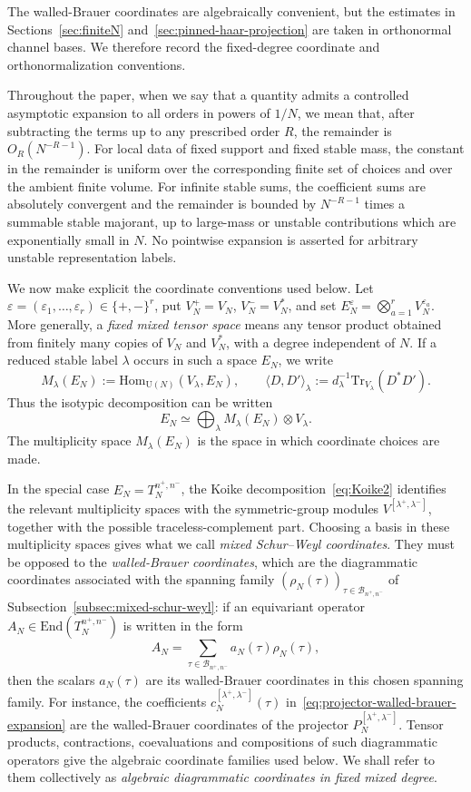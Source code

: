 \documentclass[11pt,a4paper,reqno]{amsart}
\theoremstyle{definition}
\theoremstyle{remark}
\newcommand\U{{\mathrm U}}
\newcommand\Tr{{\mathrm{Tr}}}
\newcommand\End{{\mathrm{End}}}
\newcommand\Hom{{\mathrm{Hom}}}
\begin{document}
The walled-Brauer coordinates are algebraically convenient, but the estimates in Sections~\ref{sec:finiteN} and~\ref{sec:pinned-haar-projection} are taken in orthonormal channel bases. We therefore record the fixed-degree coordinate and orthonormalization conventions.

Throughout the paper, when we say that a quantity admits a controlled asymptotic expansion to all orders in powers of $1/N$, we mean that, after subtracting the terms up to any prescribed order $R$, the remainder is $O_R(N^{-R-1})$. For local data of fixed support and fixed stable mass, the constant in the remainder is uniform over the corresponding finite set of choices and over the ambient finite volume. For infinite stable sums, the coefficient sums are absolutely convergent and the remainder is bounded by $N^{-R-1}$ times a summable stable majorant, up to large-mass or unstable contributions which are exponentially small in $N$. No pointwise expansion is asserted for arbitrary unstable representation labels.

We now make explicit the coordinate conventions used below.  Let
$\varepsilon=(\varepsilon_1,\ldots,\varepsilon_r)\in\{+,-\}^r$, put
$V_N^+=V_N$, $V_N^-=V_N^*$, and set $E_N^\varepsilon=\bigotimes_{a=1}^r V_N^{\varepsilon_a}.$ More generally, a \emph{fixed mixed tensor space} means any tensor product obtained from finitely many copies of $V_N$ and $V_N^*$, with a degree independent of $N$.  If a reduced stable label $\lambda$ occurs in such a space $E_N$, we write
\[
M_\lambda(E_N):=\Hom_{\U(N)}(V_\lambda,E_N),
\qquad
\langle D,D'\rangle_\lambda
:=d_\lambda^{-1}\Tr_{V_\lambda}(D^*D') .
\]
Thus the isotypic decomposition can be written
\begin{equation}\label{eq:isotypic-decomposition}
E_N\simeq \bigoplus_\lambda M_\lambda(E_N)\otimes V_\lambda .
\end{equation}
The multiplicity space $M_\lambda(E_N)$ is the space in which coordinate choices are made.

In the special case $E_N=T_N^{n^+,n^-}$, the Koike decomposition~\eqref{eq:Koike2} identifies the relevant multiplicity spaces with the symmetric-group modules $V^{[\lambda^+,\lambda^-]}$, together with the possible traceless-complement part.  Choosing a basis in these multiplicity spaces gives what we call \emph{mixed Schur--Weyl coordinates}. They must be opposed to the \emph{walled-Brauer coordinates}, which are the diagrammatic coordinates associated with the spanning family $(\rho_N(\tau))_{\tau\in\mathcal B_{n^+,n^-}}$ of Subsection~\ref{subsec:mixed-schur-weyl}: if an equivariant operator $A_N\in\End(T_N^{n^+,n^-})$ is written in the form
\[
A_N=\sum_{\tau\in\mathcal B_{n^+,n^-}} a_N(\tau)\rho_N(\tau),
\]
then the scalars $a_N(\tau)$ are its walled-Brauer coordinates in this chosen spanning family.  For instance, the coefficients $c_N^{[\lambda^+,\lambda^-]}(\tau)$ in~\eqref{eq:projector-walled-brauer-expansion} are the walled-Brauer coordinates of the projector $P_N^{[\lambda^+,\lambda^-]}$.  Tensor products, contractions, coevaluations and compositions of such diagrammatic operators give the algebraic coordinate families used below.  We shall refer to them collectively as \emph{algebraic diagrammatic coordinates in fixed mixed degree}.
\end{document}
